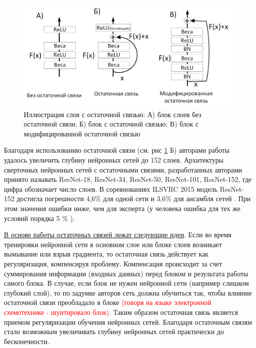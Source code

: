 \documentclass[12pt]{article}
\begin{document}
\begin{sloppypar}
\begin{figure}[!h]
	\begin{center}
		\includegraphics[width=0.99\linewidth]{./figuresch1/residual_con_v1.png}
		\caption{Иллюстрация слоя с остаточной связью: А) блок слоев без остаточной связи; Б) блок с остаточной связью; В) блок с модифицированной остаточной связью}		
		\label{ch1:fig:residual_layer}
	\end{center}
\end{figure}

Благодаря использованию остаточной связи (см. рис \ref{ch1:fig:residual_layer} Б) авторами работы  \cite{he2016deep} удалось увеличить глубину нейронных сетей до 152 слоев. Архитектуры сверточных нейронных сетей с остаточными связями, разработанных авторами \cite{he2016deep} принято называть ResNet-18, ResNet-34, ResNet-50, ResNet-101, ResNet-152, где цифра обозначает число слоев. В соревнованиях ILSVRC 2015 модель ResNet-152 достигла погрешности 4,6\% для одной сети и 3,6\% для ансамбля сетей \cite{he2016deep}. При этом значения ошибки ниже, чем для эксперта (у человека ошибка для тех же условий порядка 5 \% \cite{alom2019state}).

\uline{В основе работы остаточных связей лежат следующие идеи}. Если во время тренировки нейронной сети в основном слое или блоке слоев возникает вымывание или взрыв градиента, то остаточная связь действует как регуляризация, компенсируя проблему. Компенсация происходит за счет суммирования информации (входных данных) перед блоком и результата работы самого блока. В случае, если блок не нужен нейронной сети (например слишком глубокий слой), то по задумке авторов сеть должна обучиться так, чтобы влияние остаточной связи преобладало в блоке \textcolor{red}{(говоря на языке электронной схемотехнике - шунтировало блок)}. Таким образом остаточная связь является приемом регуляризации обучения нейронных сетей. Благодаря остаточным связям стало возможным увеличивать глубину нейронных сетей практически до бесконечности. 


\end{sloppypar}
\end{document}
